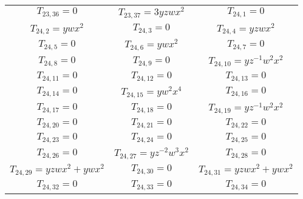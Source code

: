 \documentclass[12pt]{memoireuqam1.3}
\begin{document}
\begin{longtable}{|c|c|c|}
$T_{23,36}= 0$&

$T_{23,37}= 3yzwx^2$&

$T_{24,1}= 0$\\

$T_{24,2}= ywx^2$&

$T_{24,3}= 0$&

$T_{24,4}= yzwx^2$\\

$T_{24,5}= 0$&

$T_{24,6}= ywx^2$&

$T_{24,7}= 0$\\

$T_{24,8}= 0$&

$T_{24,9}= 0$&

$T_{24,10}= yz^{-1}w^2x^2$\\

$T_{24,11}= 0$&

$T_{24,12}= 0$&

$T_{24,13}= 0$\\

$T_{24,14}= 0$&

$T_{24,15}= yw^2x^4$&

$T_{24,16}= 0$\\

$T_{24,17}= 0$&

$T_{24,18}= 0$&

$T_{24,19}= yz^{-1}w^2x^2$\\

$T_{24,20}= 0$&

$T_{24,21}= 0$&

$T_{24,22}= 0$\\

$T_{24,23}= 0$&

$T_{24,24}= 0$&

$T_{24,25}= 0$\\

$T_{24,26}= 0$&

$T_{24,27}= yz^{-2}w^3x^2$&

$T_{24,28}= 0$\\

$T_{24,29}= yzwx^2+ywx^2$&

$T_{24,30}= 0$&

$T_{24,31}= yzwx^2+ywx^2$\\

$T_{24,32}= 0$&

$T_{24,33}= 0$&

$T_{24,34}= 0$\\


\end{longtable}
\end{document}
